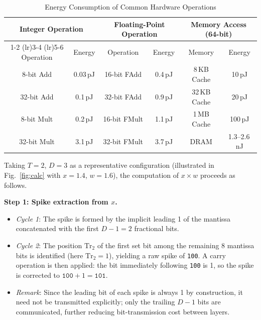 \begin{table}[htbp]
    \centering
    \caption{Energy Consumption of Common Hardware Operations}
    \label{tab:energy_operation}
    \begin{tabular}{ccc ccc}
        \toprule
        \multicolumn{2}{c}{\textbf{Integer Operation}}
        & \multicolumn{2}{c}{\textbf{Floating-Point Operation}}
        & \multicolumn{2}{c}{\textbf{Memory Access (64-bit)}} \\
        \cmidrule(lr){1-2} \cmidrule(lr){3-4} \cmidrule(lr){5-6}
        Operation   & Energy   & Operation    & Energy   & Memory       & Energy        \\
        \midrule
        8-bit Add   & 0.03\,pJ & 16-bit FAdd  & 0.4\,pJ  & 8\,KB Cache  & 10\,pJ        \\
        32-bit Add  & 0.1\,pJ  & 32-bit FAdd  & 0.9\,pJ  & 32\,KB Cache & 20\,pJ        \\
        8-bit Mult  & 0.2\,pJ  & 16-bit FMult & 1.1\,pJ  & 1\,MB Cache  & 100\,pJ       \\
        32-bit Mult & 3.1\,pJ  & 32-bit FMult & 3.7\,pJ  & DRAM         & 1.3--2.6\,nJ  \\
        \bottomrule
    \end{tabular}
\end{table}

Taking $T=2$, $D=3$ as a representative configuration (illustrated in Fig.~\ref{fig:calc} with $x=1.4$, $w=1.6$), the computation of $x \times w$ proceeds as follows.

\textbf{Step 1: Spike extraction from $x$.}
\begin{itemize}
    \item \textit{Cycle 1}: The spike is formed by the implicit leading 1 of the mantissa concatenated with the first $D-1=2$ fractional bits.
    \item \textit{Cycle 2}: The position $\mathrm{Tr}_2 $ of the first set bit among the remaining 8 mantissa bits is identified (here $\mathrm{Tr}_2=1 $), yielding a raw spike of \texttt{100}. A carry operation is then applied: the bit immediately following \texttt{100} is 1, so the spike is corrected to $\texttt{100}+1=\texttt{101}$.
    \item \textit{Remark}: Since the leading bit of each spike is always 1 by construction, it need not be transmitted explicitly; only the trailing $D-1$ bits are communicated, further reducing  bit-transmission cost between layers.
\end{itemize}

